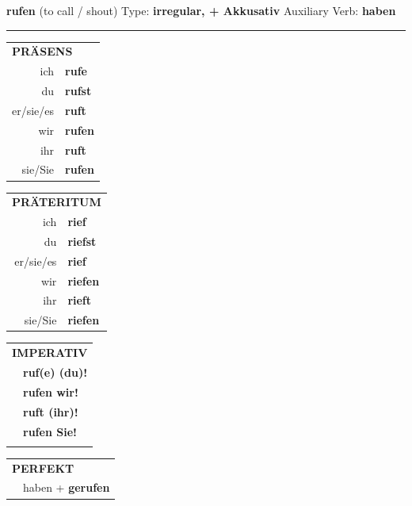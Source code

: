 \documentclass[10pt,a4paper]{revtex4-2}
\begin{document}
\begin{verbbox-acc}
    {\Large \bf rufen} (to call / shout) \hfill Type: \textbf{irregular, + Akkusativ} \hfill Auxiliary Verb: \textbf{haben} 
    
     \vspace{5pt}

    \hrule
    
    \vspace{5pt}

  \begin{tabular}{rl}
     \multicolumn{2}{l}{\textbf{PRÄSENS} }\\
    ich & \textbf{rufe}\\
    du & \textbf{rufst}\\
    er/sie/es & \textbf{ruft}\\
    wir & \textbf{rufen}\\
    ihr & \textbf{ruft}\\
    sie/Sie & \textbf{rufen}\\
  \end{tabular}
  \hfill
     \begin{tabular}{rl}
    \multicolumn{2}{l}{\textbf{PRÄTERITUM} }\\
    ich & \textbf{rief}\\
    du & \textbf{riefst}\\
    er/sie/es & \textbf{rief}\\
    wir & \textbf{riefen}\\
    ihr & \textbf{rieft}\\
    sie/Sie & \textbf{riefen}\\
  \end{tabular}
  \hfill
  \begin{tabular}{rl}
     \multicolumn{2}{l}{\textbf{IMPERATIV} }\\
   & \textbf{ruf(e) (du)!}\\
   & \textbf{rufen wir!}\\
   & \textbf{ruft (ihr)!}\\
   & \textbf{rufen Sie!}\\
   & \vspace{10pt}
  \end{tabular}

    \vspace{10pt}

 \begin{tabular}{rl}
     \multicolumn{2}{l}{\textbf{PERFEKT}}\\
   & haben + \textbf{gerufen}\\
  \end{tabular}
\hfill
   \begin{tabular}{rl}
   

\end{tabular}
\end{verbbox-acc}
\end{document}
